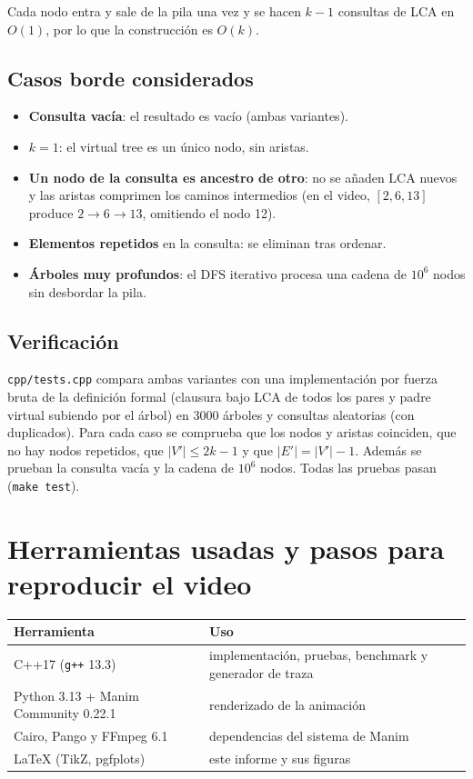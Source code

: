 \documentclass[11pt,a4paper]{article}
\theoremstyle{plain}
\begin{document}
Cada nodo entra y sale de la pila una vez y se hacen $k-1$ consultas de LCA en $O(1)$, por lo
que la construcción es $O(k)$.

\subsection{Casos borde considerados}
\begin{itemize}
  \item \textbf{Consulta vacía}: el resultado es vacío (ambas variantes).
  \item \textbf{$k=1$}: el virtual tree es un único nodo, sin aristas.
  \item \textbf{Un nodo de la consulta es ancestro de otro}: no se añaden LCA nuevos y las
        aristas comprimen los caminos intermedios (en el video, $[2, 6, 13]$ produce
        $2 \to 6 \to 13$, omitiendo el nodo 12).
  \item \textbf{Elementos repetidos} en la consulta: se eliminan tras ordenar.
  \item \textbf{Árboles muy profundos}: el DFS iterativo procesa una cadena de $10^6$ nodos
        sin desbordar la pila.
\end{itemize}

\subsection{Verificación}
\texttt{cpp/tests.cpp} compara ambas variantes con una implementación por fuerza bruta de la
definición formal (clausura bajo LCA de todos los pares y padre virtual subiendo por el árbol)
en 3000 árboles y consultas aleatorias (con duplicados). Para cada caso se comprueba que los
nodos y aristas coinciden, que no hay nodos repetidos, que $|V'| \le 2k-1$ y que
$|E'| = |V'| - 1$. Además se prueban la consulta vacía y la cadena de $10^6$ nodos. Todas las
pruebas pasan (\texttt{make test}).

\section{Herramientas usadas y pasos para reproducir el video}

\begin{table}[H]
  \centering
  \begin{tabular}{@{}>{\raggedright\arraybackslash}p{5.6cm}p{8.6cm}@{}}
    \toprule
    \textbf{Herramienta} & \textbf{Uso} \\
    \midrule
    C++17 (\texttt{g++} 13.3) & implementación, pruebas, benchmark y generador de traza \\
    Python 3.13 + Manim Community 0.22.1 & renderizado de la animación \\
    Cairo, Pango y FFmpeg 6.1 & dependencias del sistema de Manim \\
    \LaTeX{} (TikZ, pgfplots) & este informe y sus figuras \\
    \bottomrule
  \end{tabular}
\end{table}
\end{document}

